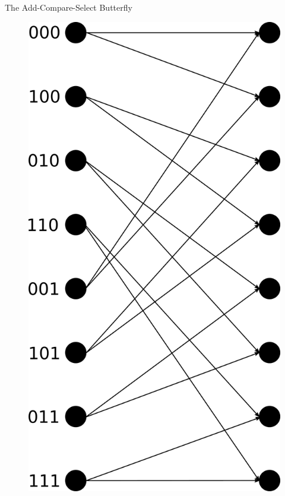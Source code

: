\documentclass[18pt]{beamer}
\begin{document}
\begin{frame}{The Add-Compare-Select Butterfly}

\begin{figure}[ht]
  \centering
  \includegraphics[scale=0.1]{logos/trellis_8.pdf}
\end{figure}

\end{frame}
\end{document}
